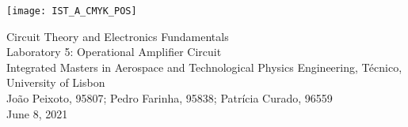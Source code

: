 
\thispagestyle {empty}

\texttt{[image: IST\_A\_CMYK\_POS]}


\begin{center}
\linespread{1.3}
%
\vspace{1.0cm}

\vspace{1cm}
{\FontLb Circuit Theory and Electronics Fundamentals} \\
\vspace{1cm}
{\FontLb Laboratory 5: Operational Amplifier Circuit} \\
\vspace{2cm}
{\FontSn Integrated Masters in Aerospace and Technological Physics Engineering, Técnico, University of Lisbon} \\ %
\vspace{1cm}
{\FontSn João Peixoto, 95807; Pedro Farinha, 95838; Patrícia Curado, 96559} \\
\vspace{1cm}
{\FontSn June 8, 2021} \\ %
\par
%
\end{center}



